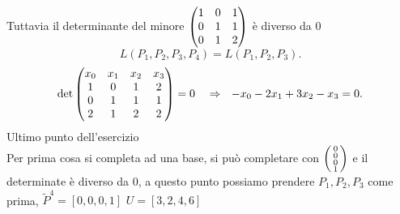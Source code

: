 \documentclass[12px]{article}
\begin{document}
	 Tuttavia il determinante del minore $\begin{pmatrix}1&0&1\\0&1&1\\0&1&2\end{pmatrix}$ è diverso da 0 
	  \[
	 L(P_1,P_2,P_3,P_4) = L(P_1,P_2,P_3)
	 .\] 
	 \[
		 \det\begin{pmatrix}x_0&x_1&x_2&x_3\\1&0&1&2\\0&1&1&1\\2&1&2&2\end{pmatrix} = 0 \ \ \ \Rightarrow  \ \ -x_0 -2x_1+3x_2-x_3=0
	 .\] 
	 Ultimo punto dell'esercizio\\
	 Per prima cosa si completa ad una base, si può completare con $\left(\begin{smallmatrix}0\\0\\0\\1\end{smallmatrix}\right)$ e il determinate è diverso da 0, a questo punto possiamo prendere  $P_1,P_2,P_3$ come prima, $\widetilde{P}^4 = [0,0,0,1] $  $ U = [3,2,4,6]$
\end{document}
